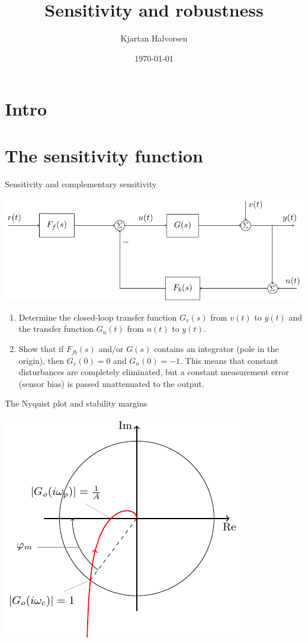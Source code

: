 \documentclass[presentation,aspectratio=169]{beamer}
\author{Kjartan Halvorsen}
\date{\today}
\title{Sensitivity and robustness}
\begin{document}
\maketitle

\section{Intro}
\label{sec:org4453306}


\section{The sensitivity function}
\label{sec:org37d7547}


\begin{frame}[label={sec:org140e392}]{Sensitivity and complementary sensitivity}
\small

\begin{center}
\includegraphics[width=0.8\linewidth]{../../figures/2dof-block-complete}
\end{center}
\pause
\begin{enumerate}
\item Determine the closed-loop transfer function \(G_v(s)\) from \(v(t)\) to \(y(t)\) and the transfer function \(G_n(t)\) from \(n(t)\) to \(y(t)\).
\end{enumerate}
\pause
\begin{enumerate}
\setcounter{enumi}{1}
\item Show that if \(F_{fb}(s)\) and/or \(G(s)\) contains an integrator (pole in the origin), then \(G_v(0) = 0\) and \(G_n(0) = -1\). This means that constant disturbances are completely eliminated, but a constant measurement error (sensor bias) is passed unattenuated to the output.
\end{enumerate}
\end{frame}

\begin{frame}[label={sec:org08e019f}]{The Nyquist plot and stability margins}
\begin{center}
\includegraphics[width=0.4\linewidth]{../../figures/implane-nyquist-margins}
\end{center}
\end{frame}
\end{document}
